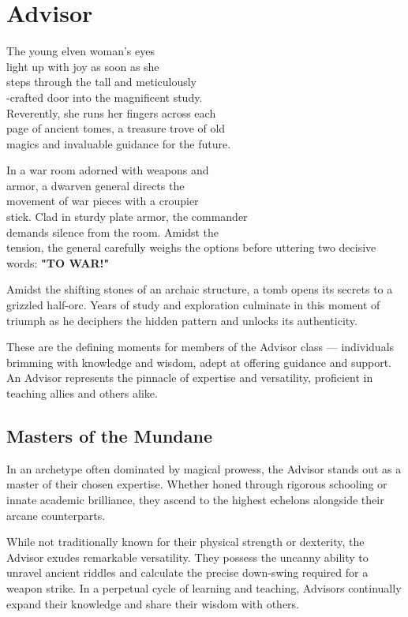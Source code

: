 \documentclass[letterpaper,openany,twoside,twocolumn]{book}
\begin{document}
	\section*{Advisor}
	\entryfont The young elven woman's eyes\\light up with joy as soon as she\\steps through the tall and meticulously\\-crafted door into the magnificent study.\\Reverently, she runs her fingers across each\\page of ancient tomes, a treasure trove of old\\magics and invaluable guidance for the future.

	In a war room adorned with weapons and\\armor, a dwarven general directs the\\movement of war pieces with a croupier\\stick. Clad in sturdy plate armor, the commander\\demands silence from the room. Amidst the\\tension, the general carefully weighs the options before uttering two decisive words: \textbf{"TO WAR!"}

	Amidst the shifting stones of an archaic structure, a tomb opens its secrets to a grizzled half-orc. Years of study and exploration culminate in this moment of triumph as he deciphers the hidden pattern and unlocks its authenticity.

	These are the defining moments for members of the Advisor class — individuals brimming with knowledge and wisdom, adept at offering guidance and support. An Advisor represents the pinnacle of expertise and versatility, proficient in teaching allies and others alike.
	\subsection{Masters of the Mundane}
	In an archetype often dominated by magical prowess, the Advisor stands out as a master of their chosen expertise. Whether honed through rigorous schooling or innate academic brilliance, they ascend to the highest echelons alongside their arcane counterparts.

	While not traditionally known for their physical strength or dexterity, the Advisor exudes remarkable versatility. They possess the uncanny ability to unravel ancient riddles and calculate the precise down-swing required for a weapon strike. In a perpetual cycle of learning and teaching, Advisors continually expand their knowledge and share their wisdom with others.
\end{document}
